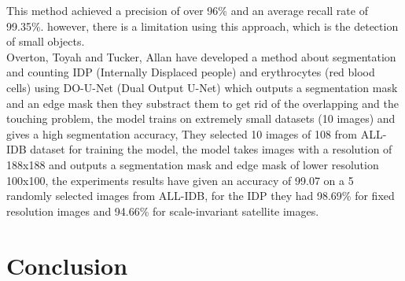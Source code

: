 This method achieved a precision of over 96\% and an average recall rate of 99.35\%. however, there is a limitation using this approach, which is the detection of small objects.\\

Overton, Toyah and Tucker, Allan \textsuperscript{\cite{10.1007/978-3-030-44584-3_31}} have developed a method about segmentation and counting IDP (Internally Displaced people) and erythrocytes (red blood cells) using DO-U-Net (Dual Output U-Net) which outputs a segmentation mask and an edge mask then they substract them to get rid of the overlapping and the touching problem, the model trains on extremely small datasets (10 images) and gives a high segmentation accuracy, They selected 10 images of 108 from ALL-IDB dataset for training the model, the model takes images with a resolution of 188x188 and outputs a segmentation mask and edge mask of lower resolution 100x100, the experiments results have given an accuracy of 99.07 on a 5 randomly selected images from ALL-IDB, for the IDP they had 98.69\% for fixed resolution images and 94.66\% for scale-invariant satellite images.\\

\section{Conclusion}
\vspace{0.1in}
\hspace*{0.16in}

